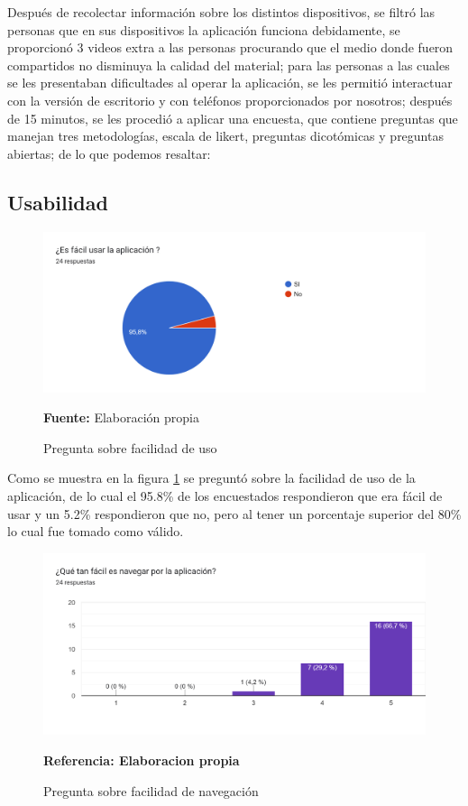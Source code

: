 \documentclass[12pt,twocolumn,a4paper]{article}
\begin{document}
Después de recolectar información sobre los distintos dispositivos, se filtró las personas que en sus dispositivos la aplicación funciona debidamente, se proporcionó 3 videos extra a  las personas procurando que el medio donde fueron compartidos no disminuya la calidad del material; para las personas a las cuales se les presentaban dificultades al operar la aplicación, se les permitió interactuar con la versión de escritorio y con teléfonos proporcionados por nosotros; después de  15 minutos, se les procedió a aplicar una encuesta, que contiene preguntas  que manejan tres metodologías, escala de likert, preguntas dicotómicas y preguntas abiertas; de lo que podemos resaltar:

\subsection{Usabilidad}

\begin{figure}
	\includegraphics[scale=0.4]{Encuesta1.png}
	\caption{Pregunta sobre facilidad de uso} \textbf{Fuente:} Elaboración propia 
	\label{Encuesta1}
\end{figure}

Como se muestra en la figura \ref{Encuesta1} se preguntó sobre la facilidad de uso de la aplicación, de lo cual el 95.8\% de los encuestados respondieron que era fácil de usar y un 5.2\% respondieron que no, pero al tener un porcentaje superior del 80\% lo cual fue tomado como válido.

\begin{figure}
	\centering
	\includegraphics[scale=0.2]{Encuesta2.png}
	\caption{Pregunta sobre facilidad de navegación} \textbf{Referencia: Elaboracion propia} 
	\label{Encuesta2}
\end{figure}
\end{document}
